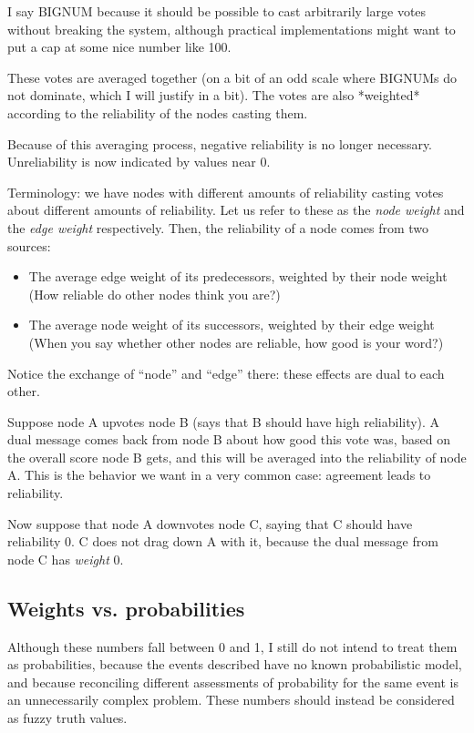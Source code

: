 \documentclass{article}
\begin{document}
I say BIGNUM because it should be possible to cast arbitrarily large votes
without breaking the system, although practical implementations might want to
put a cap at some nice number like 100.

These votes are averaged together (on a bit of an odd scale where BIGNUMs do
not dominate, which I will justify in a bit). The votes are also *weighted*
according to the reliability of the nodes casting them.

Because of this averaging process, negative reliability is no longer necessary.
Unreliability is now indicated by values near 0.

Terminology: we have nodes with different amounts of reliability casting votes
about different amounts of reliability. Let us refer to these as the \emph{node
weight} and the \emph{edge weight} respectively. Then, the reliability of a
node comes from two sources:

\begin{itemize}
\item The average edge weight of its predecessors, weighted by their node weight
  (How reliable do other nodes think you are?)
\item The average node weight of its successors, weighted by their edge weight
  (When you say whether other nodes are reliable, how good is your word?)
\end{itemize}

Notice the exchange of ``node'' and ``edge'' there: these effects are dual to
each other. 

Suppose node A upvotes node B (says that B should have high reliability). A
dual message comes back from node B about how good this vote was, based on the
overall score node B gets, and this will be averaged into the reliability of
node A. This is the behavior we want in a very common case: agreement leads to
reliability.

Now suppose that node A downvotes node C, saying that C should have reliability
0. C does not drag down A with it, because the dual message from node C has
\emph{weight} 0.

\subsection{Weights vs. probabilities}

Although these numbers fall between 0 and 1, I still do not intend to treat
them as probabilities, because the events described have no known probabilistic
model, and because reconciling different assessments of probability for the
same event is an unnecessarily complex problem. These numbers should instead be
considered as fuzzy truth values.
\end{document}
